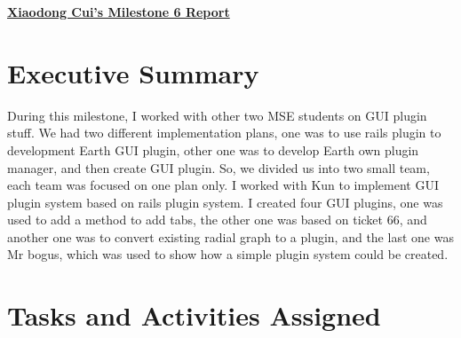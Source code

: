 \pagestyle{headings}

\begin{center}
{\large\textbf{\underline{{Xiaodong Cui's Milestone 6 Report}}}}
\end{center}

\section*{Executive Summary}

During this milestone, I worked with other two MSE students on GUI plugin stuff. We had two different implementation plans, one was to use rails plugin to development Earth GUI plugin, other one was to develop Earth own plugin manager, and then create GUI plugin. So, we divided us into two small team, each team was focused on one plan only. I worked with Kun to implement GUI plugin system based on rails plugin system. I created four GUI plugins, one was used to add a method to add tabs, the other one was based on ticket 66, and another one was to convert existing radial graph to a plugin, and the last one was Mr bogus, which was used to show how a simple plugin system could be created.

\section*{Tasks and Activities Assigned}

